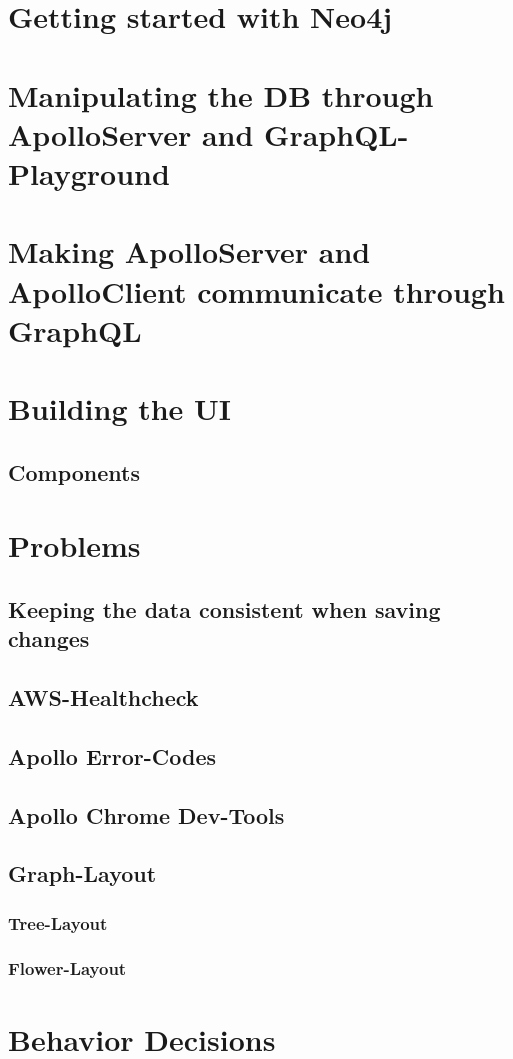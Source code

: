 \section{Getting started with Neo4j}
\section{Manipulating the DB through ApolloServer and GraphQL-Playground}
\section{Making ApolloServer and ApolloClient communicate through GraphQL}
\section{Building the UI}
\subsection{Components}
\section{Problems}
\subsection{Keeping the data consistent when saving changes}
\subsection{AWS-Healthcheck}
\subsection{Apollo Error-Codes}
\subsection{Apollo Chrome Dev-Tools}
\subsection{Graph-Layout}
\subsubsection{Tree-Layout}
\subsubsection{Flower-Layout}
\section{Behavior Decisions}
